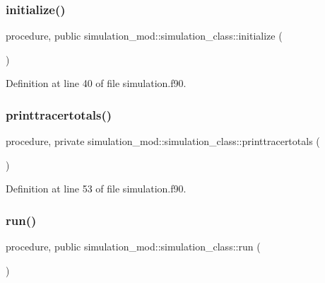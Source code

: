 \subsubsection{\texorpdfstring{initialize()}{initialize()}}
{\footnotesize\ttfamily procedure, public simulation\+\_\+mod\+::simulation\+\_\+class\+::initialize (\begin{DoxyParamCaption}{ }\end{DoxyParamCaption})}



Definition at line 40 of file simulation.\+f90.

\mbox{\label{structsimulation__mod_1_1simulation__class_a8ddba2b86c2137f5dfc7fcd301badd66}} 
\subsubsection{\texorpdfstring{printtracertotals()}{printtracertotals()}}
{\footnotesize\ttfamily procedure, private simulation\+\_\+mod\+::simulation\+\_\+class\+::printtracertotals (\begin{DoxyParamCaption}{ }\end{DoxyParamCaption})\hspace{0.3cm}{\ttfamily [private]}}



Definition at line 53 of file simulation.\+f90.

\mbox{\label{structsimulation__mod_1_1simulation__class_a47c2f9dd8a012a523ac88aa8d3c6a911}} 
\subsubsection{\texorpdfstring{run()}{run()}}
{\footnotesize\ttfamily procedure, public simulation\+\_\+mod\+::simulation\+\_\+class\+::run (\begin{DoxyParamCaption}{ }\end{DoxyParamCaption})}



